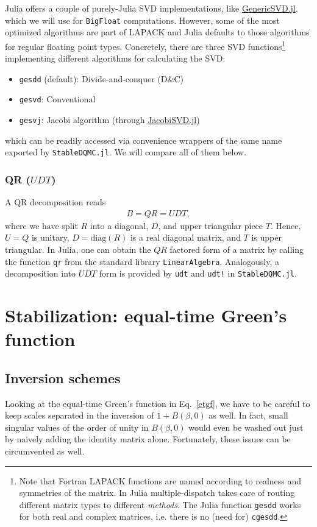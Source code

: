 \documentclass[submission, Phys]{SciPost}
\begin{document}
Julia offers a couple of purely-Julia SVD implementations, like \href{https://github.com/JuliaLinearAlgebra/GenericSVD.jl/}{GenericSVD.jl}, which we will use for \texttt{BigFloat} computations. However, some of the most optimized algorithms are part of LAPACK \cite{LAPACK} and Julia defaults to those algorithms for regular floating point types. Concretely, there are three SVD functions\footnote{Note that Fortran LAPACK functions are named according to realness and symmetries of the matrix. In Julia multiple-dispatch takes care of routing different matrix types to different \textit{methods}. The Julia function \texttt{gesdd} works for both real and complex matrices, i.e. there is no (need for) \texttt{cgesdd}.} implementing different algorithms for calculating the SVD:
\begin{itemize}
	\item \texttt{gesdd} (default): Divide-and-conquer (D\&C)
	\item \texttt{gesvd}: Conventional
	\item \texttt{gesvj}: Jacobi algorithm (through \href{https://github.com/RalphAS/JacobiSVD.jl}{JacobiSVD.jl})
\end{itemize}
which can be readily accessed via convenience wrappers of the same name exported by \texttt{StableDQMC.jl}. We will compare all of them below.

\subsubsection{QR ($UDT$)}
A QR decomposition reads
\begin{align}
	B = QR = UDT,
\end{align}
where we have split $R$ into a diagonal, $D$, and upper triangular piece $T$. Hence, $U = Q$ is unitary, $D = \textrm{diag}(R)$ is a real diagonal matrix, and $T$ is upper triangular. In Julia, one can obtain the $QR$ factored form of a matrix by calling the function \texttt{qr} from the standard library \texttt{LinearAlgebra}. Analogously, a decomposition into $UDT$ form is provided by \texttt{udt} and \texttt{udt!} in \texttt{StableDQMC.jl}.

\section{Stabilization: equal-time Green's function}

\subsection{Inversion schemes}
Looking at the equal-time Green's function in Eq.~\ref{etgf}, we have to be careful to keep scales separated in the inversion of $1 + B(\beta, 0)$ as well. In fact, small singular values of the order of unity in $B(\beta, 0)$ would even be washed out just by naively adding the identity matrix alone. Fortunately, these issues can be circumvented as well.
\end{document}
